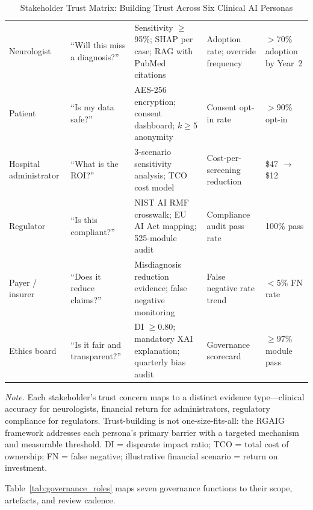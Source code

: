 \begin{table}[H]
\tablestripes
\tablefontsize
\caption[Stakeholder Trust Matrix]{Stakeholder Trust Matrix: Building Trust Across Six Clinical AI Personas}
\begin{tabularx}{\textwidth}{@{} p{1.6cm} L L p{2.0cm} p{1.6cm} @{}}
\toprule
{} &  &  &  &  \\
\midrule
Neurologist & ``Will this miss a diagnosis?'' & Sensitivity $\geq$95\%; SHAP per case; RAG with PubMed citations & Adoption rate; override frequency & $>$70\% adoption by Year~2 \\
\addlinespace
Patient & ``Is my data safe?'' & AES-256 encryption; consent dashboard; $k \geq 5$ anonymity & Consent opt-in rate & $>$90\% opt-in \\
\addlinespace
Hospital administrator & ``What is the ROI?'' & 3-scenario sensitivity analysis; TCO cost model & Cost-per-screening reduction & \$47 $\to$ \$12 \\
\addlinespace
Regulator & ``Is this compliant?'' & NIST AI RMF crosswalk; EU AI Act mapping; 525-module audit & Compliance audit pass rate & 100\% pass \\
\addlinespace
Payer / insurer & ``Does it reduce claims?'' & Misdiagnosis reduction evidence; false negative monitoring & False negative rate trend & $<$5\% FN rate \\
\addlinespace
Ethics board & ``Is it fair and transparent?'' & DI $\geq$0.80; mandatory XAI explanation; quarterly bias audit & Governance scorecard & $\geq$97\% module pass \\
\bottomrule
\end{tabularx}
\vspace{0.5em}\noindent\textit{Note.} Each stakeholder's trust concern maps to a distinct evidence type---clinical accuracy for neurologists, financial return for administrators, regulatory compliance for regulators. Trust-building is not one-size-fits-all: the RGAIG framework addresses each persona's primary barrier with a targeted mechanism and measurable threshold. DI = disparate impact ratio; TCO = total cost of ownership; FN = false negative; illustrative financial scenario = return on investment.
\end{table}

Table~\ref{tab:governance_roles} maps seven governance functions to their scope, artefacts, and review cadence.

